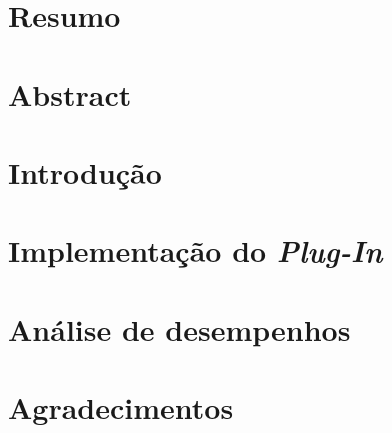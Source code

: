 \documentclass[12pt, a4paper]{report}
\begin{document}
	
	\chapter*{Resumo}
	\chapter*{Abstract}
	\chapter{Introdução}
	
	
	
	
	
	
	
	
	
	\chapter{Implementação do \textit{Plug-In}}
	\chapter{Análise de desempenhos}
	\chapter*{Agradecimentos}
	
	
	
	 
\end{document}
